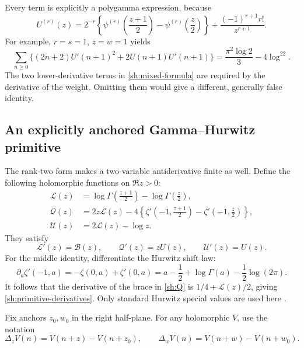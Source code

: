 \documentclass[11pt,letterpaper]{article}
\numberwithin{equation}{section}
\theoremstyle{definition}
\theoremstyle{remark}
\newcommand{\Bcal}{\mathcal B}
\begin{document}
Every term is explicitly a polygamma expression, because
\begin{equation}\label{sh:polygamma}
 U^{(r)}(z)=2^{-r}\left\{
   \psi^{(r)}\left(\frac{z+1}{2}\right)
  -\psi^{(r)}\left(\frac z2\right)\right\}
       +\frac{(-1)^{r+1}r!}{z^{r+1}}.
\end{equation}
For example, $r=s=1$, $z=w=1$ yields
\begin{equation}\label{sh:derivative-example}
 \sum_{n\ge0}\{(2n+2)U'(n+1)^2+2U(n+1)U'(n+1)\}
        =\frac{\pi^2\log2}{3}-4\log^22.
\end{equation}
The two lower-derivative terms in \eqref{sh:mixed-formula} are
required by the derivative of the weight. Omitting them would give
a different, generally false identity.

\subsection{An explicitly anchored Gamma--Hurwitz primitive}

The rank-two form makes a two-variable antiderivative finite as well.
Define the following holomorphic functions on $\Re z>0$:
\begin{align}
 \mathcal L(z)&=\log\Gamma\left(\frac{z+1}{2}\right)
                         -\log\Gamma\left(\frac z2\right),\label{sh:L}\\
 \mathcal Q(z)&=2z\mathcal L(z)-4\left\{
 \zeta'\left(-1,\frac{z+1}{2}\right)
                   -\zeta'\left(-1,\frac z2\right)\right\},\label{sh:Q}\\
 \mathcal U(z)&=2\mathcal L(z)-\log z.\label{sh:primitiveU}
\end{align}
They satisfy
\begin{equation}\label{sh:primitive-derivatives}
 \mathcal L'(z)=\Bcal(z),\qquad
 \mathcal Q'(z)=zU(z),\qquad
 \mathcal U'(z)=U(z).
\end{equation}
For the middle identity, differentiate the Hurwitz shift law:
\[
 \partial_a\zeta'(-1,a)=-\zeta(0,a)+\zeta'(0,a)
        =a-\frac12+\log\Gamma(a)-\frac12\log(2\pi).
\]
It follows that the derivative of the brace in \eqref{sh:Q} is
$1/4+\mathcal L(z)/2$, giving \eqref{sh:primitive-derivatives}.
Only standard Hurwitz special values are used here \cite{DLMFZeta}.

Fix anchors $z_0,w_0$ in the right half-plane. For any holomorphic
$V$, use the notation
\[
 \Delta_zV(n)=V(n+z)-V(n+z_0),\qquad
 \Delta_wV(n)=V(n+w)-V(n+w_0).
\]
\end{document}
